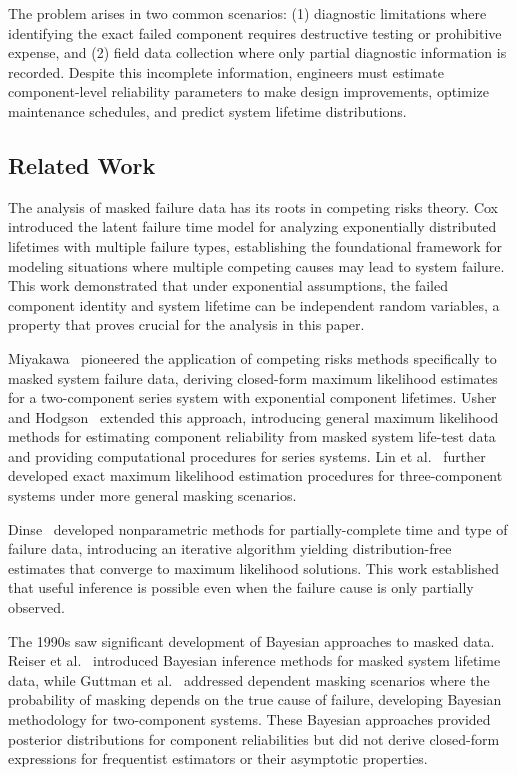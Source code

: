 \documentclass[12pt]{article}
\theoremstyle{definition}
\theoremstyle{remark}
\begin{document}
The problem arises in two common scenarios: (1) diagnostic limitations where identifying the exact failed component requires destructive testing or prohibitive expense, and (2) field data collection where only partial diagnostic information is recorded. Despite this incomplete information, engineers must estimate component-level reliability parameters to make design improvements, optimize maintenance schedules, and predict system lifetime distributions.

\subsection{Related Work}

The analysis of masked failure data has its roots in competing risks theory. Cox~\cite{cox1959} introduced the latent failure time model for analyzing exponentially distributed lifetimes with multiple failure types, establishing the foundational framework for modeling situations where multiple competing causes may lead to system failure. This work demonstrated that under exponential assumptions, the failed component identity and system lifetime can be independent random variables, a property that proves crucial for the analysis in this paper.

Miyakawa~\cite{miyakawa1984} pioneered the application of competing risks methods specifically to masked system failure data, deriving closed-form maximum likelihood estimates for a two-component series system with exponential component lifetimes. Usher and Hodgson~\cite{usher1988} extended this approach, introducing general maximum likelihood methods for estimating component reliability from masked system life-test data and providing computational procedures for series systems. Lin et al.~\cite{exactmle} further developed exact maximum likelihood estimation procedures for three-component systems under more general masking scenarios.

Dinse~\cite{dinse1982} developed nonparametric methods for partially-complete time and type of failure data, introducing an iterative algorithm yielding distribution-free estimates that converge to maximum likelihood solutions. This work established that useful inference is possible even when the failure cause is only partially observed.

The 1990s saw significant development of Bayesian approaches to masked data. Reiser et al.~\cite{reiser1995} introduced Bayesian inference methods for masked system lifetime data, while Guttman et al.~\cite{guttman1995} addressed dependent masking scenarios where the probability of masking depends on the true cause of failure, developing Bayesian methodology for two-component systems. These Bayesian approaches provided posterior distributions for component reliabilities but did not derive closed-form expressions for frequentist estimators or their asymptotic properties.
\end{document}
